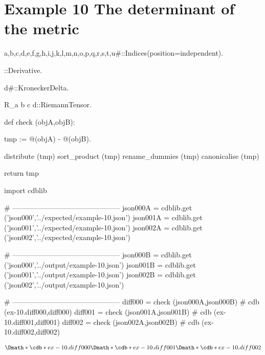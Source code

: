 \documentclass[12pt]{cdblatex}
\begin{document}
\section*{Example 10 The determinant of the metric}

\begin{cadabra}
   {a,b,c,d,e,f,g,h,i,j,k,l,m,n,o,p,q,r,s,t,u#}::Indices(position=independent).

   \nabla{#}::Derivative.

   d{#}::KroneckerDelta.

   R_{a b c d}::RiemannTensor.

   def check (objA,objB):

       tmp := @(objA) - @(objB).

       distribute     (tmp)
       sort_product   (tmp)
       rename_dummies (tmp)
       canonicalise   (tmp)

       return tmp

   import cdblib

   # ---------------------------------------------
   json000A = cdblib.get ('json000','../expected/example-10.json')
   json001A = cdblib.get ('json001','../expected/example-10.json')
   json002A = cdblib.get ('json002','../expected/example-10.json')

   # ---------------------------------------------
   json000B = cdblib.get ('json000','../output/example-10.json')
   json001B = cdblib.get ('json001','../output/example-10.json')
   json002B = cdblib.get ('json002','../output/example-10.json')

   # ---------------------------------------------
   diff000 = check (json000A,json000B)   # cdb (ex-10.diff000,diff000)
   diff001 = check (json001A,json001B)   # cdb (ex-10.diff001,diff001)
   diff002 = check (json002A,json002B)   # cdb (ex-10.diff002,diff002)

\end{cadabra}

\clearpage

\begin{dgroup*}
   \Dmath*{\cdb*{ex-10.diff000}}
   \Dmath*{\cdb*{ex-10.diff001}}
   \Dmath*{\cdb*{ex-10.diff002}}
\end{dgroup*}
\end{document}

